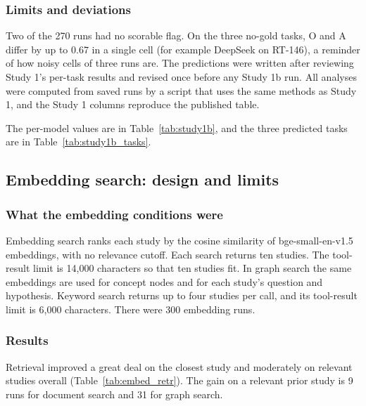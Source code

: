 \documentclass[11pt]{article}
\begin{document}
\subsubsection{Limits and deviations}

Two of the 270 runs had no scorable flag. On the three no-gold tasks, O and A differ by up to 0.67 in a single cell (for example DeepSeek on RT-146), a reminder of how noisy cells of three runs are. The predictions were written after reviewing Study 1's per-task results and revised once before any Study 1b run. All analyses were computed from saved runs by a script that uses the same methods as Study 1, and the Study 1 columns reproduce the published table.


The per-model values are in Table~\ref{tab:study1b}, and the three predicted tasks are in Table~\ref{tab:study1b_tasks}.

\subsection{Embedding search: design and limits}
\label{app:embed}

\subsubsection{What the embedding conditions were}

Embedding search ranks each study by the cosine similarity of bge-small-en-v1.5 embeddings, with no relevance cutoff. Each search returns ten studies. The tool-result limit is 14,000 characters so that ten studies fit. In graph search the same embeddings are used for concept nodes and for each study's question and hypothesis. Keyword search returns up to four studies per call, and its tool-result limit is 6,000 characters. There were 300 embedding runs.

\subsubsection{Results}

Retrieval improved a great deal on the closest study and moderately on relevant studies overall (Table~\ref{tab:embed_retr}). The gain on a relevant prior study is 9 runs for document search and 31 for graph search.
\end{document}
